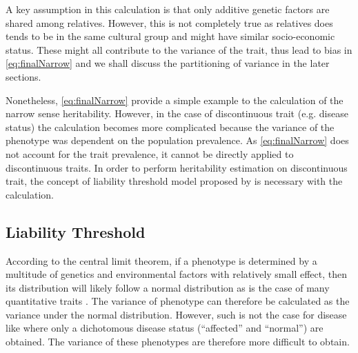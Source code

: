 	A key assumption in this calculation is that only additive genetic factors are shared among relatives.
	However, this is not completely true as relatives does tends to be in the same cultural group and might have similar socio-economic status.
	These might all contribute to the variance of the trait, thus lead to bias in \cref{eq:finalNarrow} and we shall discuss the partitioning of variance in the later sections.
	
	Nonetheless, \cref{eq:finalNarrow} provide a simple example to the calculation of the narrow sense heritability.
	However, in the case of discontinuous trait (e.g. disease status) the calculation becomes more complicated because the variance of the phenotype was dependent on the population prevalence.
	As \cref{eq:finalNarrow} does not account for the trait prevalence, it cannot be directly applied to discontinuous traits.
	In order to perform heritability estimation on discontinuous trait, the concept of liability threshold model proposed by \cite{Falconer1965} is necessary with the calculation.
	
	\subsection{Liability Threshold}
	\label{sec:liability}
	According to the central limit theorem, if a phenotype is determined by a multitude of genetics and environmental factors with relatively small effect, then its distribution will likely follow a normal distribution as is the case of many quantitative traits \citep{Visscher2008}. %
	The variance of phenotype can therefore be calculated as the variance under the normal distribution.
	However, such is not the case for disease like  where only a dichotomous disease status (``affected'' and ``normal'') are obtained.
	The variance of these phenotypes are therefore more difficult to obtain.
	
